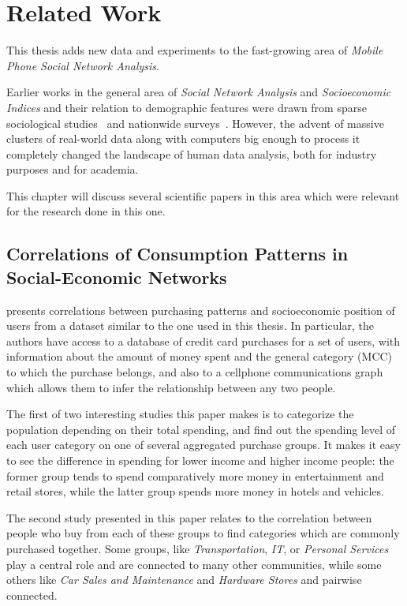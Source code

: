 
\chapter{Related Work}
\label{chap:related_work}


This thesis adds new data and experiments to the fast-growing area of \emph{Mobile Phone Social Network Analysis}.

Earlier works in the general area of \emph{Social Network Analysis} and \emph{Socioeconomic Indices} and their relation to demographic features were drawn from sparse sociological studies~\cite{katz_economics_2001} and nationwide surveys~\cite{deaton1997}. However, the advent of massive clusters of real-world data along with computers big enough to process it completely changed the landscape of human data analysis, both for industry purposes and for academia.

This chapter will discuss several scientific papers in this area which were relevant for the research done in this one.

\section{Correlations of Consumption Patterns in Social-Economic Networks}
\label{sec:leo_correlations}

\cite{leo16correlations} presents correlations between purchasing patterns and socioeconomic position of users from a dataset similar to the one used in this thesis. In particular, the authors have access to a database of credit card purchases for a set of users, with information about the amount of money spent and the general category (MCC) to which the purchase belongs, and also to a cellphone communications graph which allows them to infer the relationship between any two people.

The first of two interesting studies this paper makes is to categorize the population depending on their total spending, and find out the spending level of each user category on one of several aggregated purchase groups. It makes it easy to see the difference in spending for lower income and higher income people: the former group tends to spend comparatively more money in entertainment and retail stores, while the latter group spends more money in hotels and vehicles.

The second study presented in this paper relates to the correlation between people who buy from each of these groups to find categories which are commonly purchased together. Some groups, like \emph{Transportation}, \emph{IT}, or \emph{Personal Services} play a central role and are connected to many other communities, while some others like \emph{Car Sales and Maintenance} and \emph{Hardware Stores} and pairwise connected.

